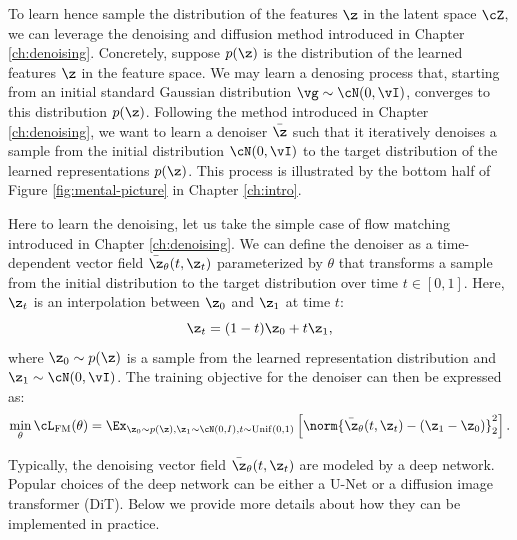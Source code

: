 \documentclass[../../book-main.tex]{subfiles}
\begin{document}
To learn hence sample the distribution of the features $\z$ in the
latent space $\cZ$, we can leverage the denoising and diffusion
method introduced in Chapter \ref{ch:denoising}. Concretely, suppose
$p(\z)$ is the distribution of the learned features $\z$ in the
feature space. We may learn a denosing process that, starting from an
initial standard Gaussian distribution $\vg \sim \cN(0, \vI)$,
converges to this distribution $p(\z)$. Following the method
introduced in Chapter \ref{ch:denoising}, we want to learn a denoiser
$\bar{\z}$ such that it iteratively
denoises a sample from the initial distribution $\cN(0, \vI)$ to the
target distribution of the learned representations $p(\z)$. This
process is illustrated by the bottom half of Figure
\ref{fig:mental-picture} in Chapter \ref{ch:intro}.

Here to learn the denoising,  let us take the simple case of flow
matching introduced in Chapter \ref{ch:denoising}. We can define the
denoiser as a time-dependent vector field $\bar{\z}_{\theta}(t,
\z_t)$ parameterized by $\theta$ that transforms a sample from the
initial distribution to the target distribution over time $t \in [0,
1]$. Here, $\z_t$ is an interpolation between $\z_0$ and $\z_1$ at time $t$:
\begin{equation}
\z_t = (1 - t)\z_0 + t\z_1,
\end{equation}
where $\z_0 \sim p(\z)$ is a sample from the learned representation
distribution and $\z_1 \sim \cN(0, \vI)$.
The training objective for the denoiser can then be expressed as:
\begin{equation}
\min_{\theta} \cL_{\mathrm{FM}}(\theta) = \Ex_{\z_0 \sim p(\z), \z_1
\sim \cN(0, I), t \sim \mathrm{Unif}(0, 1)} \left[
\norm{\bar{\z}_{\theta}(t,\z_t) - (\z_1 - \z_0)}_2^2 \right].
\end{equation}

Typically, the denoising vector field $\bar{\z}_{\theta}(t,
\z_t)$ are modeled by a deep network. Popular choices of the deep
network can be either a U-Net or a diffusion image transformer (DiT).
Below we provide more details about how they can be implemented in practice.

\end{document}
